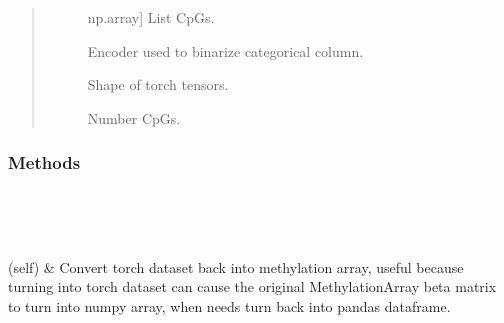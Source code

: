 \documentclass[letterpaper,10pt,english]{sphinxmanual}
\begin{document}
\begin{fulllineitems}
\begin{quote}
\begin{description}
\begin{description}
\item[{}] \leavevmode{[}np.array{]}
List CpGs.

\item[{}] \leavevmode
Encoder used to binarize categorical column.

\item[{}] \leavevmode
Shape of torch tensors.

\item[{}] \leavevmode
Number CpGs.

\item[{}] \leavevmode
\item[{}] \leavevmode
\item[{}] \leavevmode
\end{description}

\end{description}\end{quote}
\subsubsection*{Methods}


\begin{savenotes}\sphinxatlongtablestart\begin{longtable}{}
\hline

\endfirsthead

%
{}\\
\hline

\endhead

\hline
{}\\
\endfoot

\endlastfoot

(self)
&
Convert torch dataset back into methylation array, useful because turning into torch dataset can cause the original MethylationArray beta matrix to turn into numpy array, when needs turn back into pandas dataframe.
\\
\hline
\end{longtable}\sphinxatlongtableend\end{savenotes}

\end{fulllineitems}
\end{document}
